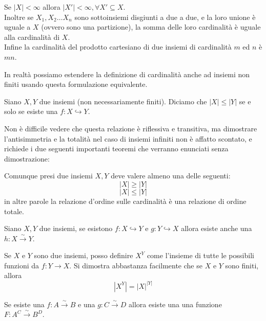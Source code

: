 \documentclass[11pt]{scrartcl}
\newcommand{\inj}{\hookrightarrow}
\begin{document}
	\begin{lemma}
		Se $|X|<\infty$ allora $|X'|<\infty,\forall X'\subseteq X$. \\
		 Inoltre se $X_1,X_2\dots X_n$ sono sottoinsiemi disgiunti a due a due, e la loro unione è uguale a $X$ (ovvero sono una partizione), la somma delle loro cardinalità è uguale alla cardinalità di $X$. \\
		 Infine la cardinalità del prodotto cartesiano di due insiemi di cardinalità $m$ ed $n$ è $mn$.
	\end{lemma}
	
	In realtà possiamo estendere la definizione di cardinalità anche ad insiemi non finiti usando questa formulazione equivalente.
		
	\begin{definition}
		Siano $X,Y$ due insiemi (non necessariamente finiti). Diciamo che $|X|\le |Y|$ se e solo se esiste una $f:X\inj Y$.
	\end{definition}
	Non è difficile vedere che questa relazione è riflessiva e transitiva, ma dimostrare l'antisimmetria e la totalità nel caso di insiemi infiniti non è affatto scontato, e richiede i due seguenti importanti teoremi che verranno enunciati senza dimostrazione:
	\begin{theorem}[Hartogs]
		Comunque presi due insiemi $X,Y$ deve valere almeno una delle seguenti:
		$$|X|\ge |Y|$$
		$$|X|\le |Y|$$
		in altre parole la relazione d'ordine sulle cardinalità è una relazione di ordine totale.
	\end{theorem}
	\begin{theorem}
		Siano $X,Y$ due insiemi, se esistono $f:X\hookrightarrow Y$ e $g:Y\hookrightarrow X$ allora esiste anche una $h:X\xrightarrow{\sim}Y$.
	\end{theorem}
	
	\begin{definition}
		Se $X$ e $Y$ sono due insiemi, posso definire $X^Y$ come l'insieme di tutte le possibili funzioni da $f:Y\to X$. Si dimostra abbastanza facilmente che se $X$ e $Y$ sono finiti, allora $$\left|X^Y\right|=\left|X\right|^{\left|Y\right|}$$
	\end{definition}
	\begin{remark}
		Se esiste una $f:A\xrightarrow{\sim}B$ e una $g:C\xrightarrow{\sim}D$ allora esiste una una funzione $F:A^C\xrightarrow{\sim}B^D$.
	\end{remark}
	
\end{document}

